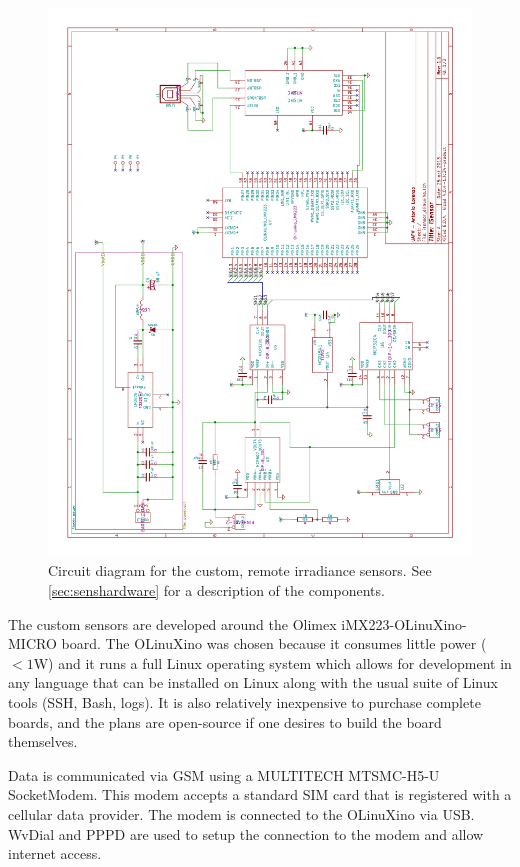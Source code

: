 \begin{figure}
\includegraphics[angle=-90,width=\textwidth]{figs/circuit.pdf}
\caption[Custom sensor circuit diagram]{Circuit diagram for the
  custom, remote irradiance sensors. See \cref{sec:senshardware} for a
  description of the components.}
\label{fig:circuit}
\end{figure}

The custom sensors are developed around the Olimex
iMX223-OLinuXino-MICRO board.
The OLinuXino was chosen because it consumes little power ($< 1$W) and it
runs a full Linux operating system which allows for development in any
language that can be installed on Linux along with the usual suite of
Linux tools (SSH, Bash, logs).
It is also relatively inexpensive to purchase complete boards, and the
plans are open-source if one desires to build the board themselves.

Data is communicated via GSM using a MULTITECH MTSMC-H5-U SocketModem.
This modem accepts a standard SIM card that is registered with a
cellular data provider.
The modem is connected to the OLinuXino via USB.
WvDial and PPPD are used to setup the connection to the modem and
allow internet access.

